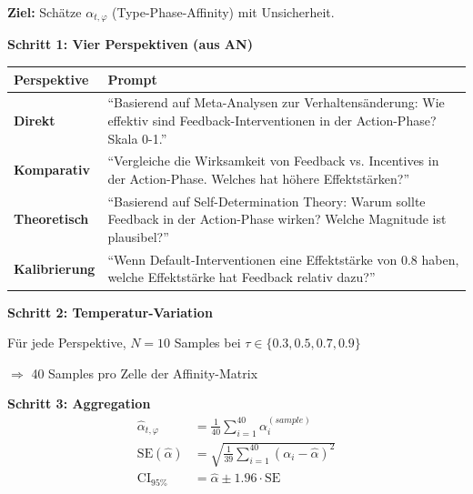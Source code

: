 \begin{tcolorbox}[colback=gray!5!white, colframe=gray!75!black,
    title=\textbf{Protokoll HHH-LLMMC-1: Affinity-Matrix-Schätzung}]

\textbf{Ziel:} Schätze $\alpha_{t,\varphi}$ (Type-Phase-Affinity) mit Unsicherheit.

\textbf{Schritt 1: Vier Perspektiven (aus AN)}

\begin{center}
\renewcommand{\arraystretch}{1.2}
\begin{tabular}{@{}p{2cm}p{9cm}@{}}
\toprule
\textbf{Perspektive} & \textbf{Prompt} \\
\midrule
\textbf{Direkt} & ``Basierend auf Meta-Analysen zur Verhaltensänderung: Wie effektiv sind Feedback-Interventionen in der Action-Phase? Skala 0-1.'' \\
\textbf{Komparativ} & ``Vergleiche die Wirksamkeit von Feedback vs. Incentives in der Action-Phase. Welches hat höhere Effektstärken?'' \\
\textbf{Theoretisch} & ``Basierend auf Self-Determination Theory: Warum sollte Feedback in der Action-Phase wirken? Welche Magnitude ist plausibel?'' \\
\textbf{Kalibrierung} & ``Wenn Default-Interventionen eine Effektstärke von 0.8 haben, welche Effektstärke hat Feedback relativ dazu?'' \\
\bottomrule
\end{tabular}
\end{center}

\textbf{Schritt 2: Temperatur-Variation}

Für jede Perspektive, $N = 10$ Samples bei $\tau \in \{0.3, 0.5, 0.7, 0.9\}$

$\Rightarrow$ 40 Samples pro Zelle der Affinity-Matrix

\textbf{Schritt 3: Aggregation}
\begin{align}
\hat{\alpha}_{t,\varphi} &= \frac{1}{40} \sum_{i=1}^{40} \alpha_i^{(sample)} \\
\text{SE}(\hat{\alpha}) &= \sqrt{\frac{1}{39} \sum_{i=1}^{40} (\alpha_i - \hat{\alpha})^2} \\
\text{CI}_{95\%} &= \hat{\alpha} \pm 1.96 \cdot \text{SE}
\end{align}

\end{tcolorbox}

